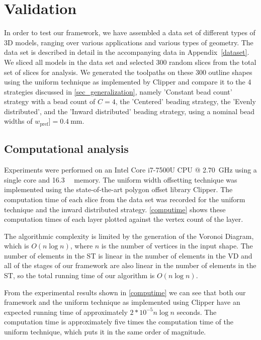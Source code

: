 \section{Validation}
In order to test our framework, we have assembled a data set of different types of 3D models, ranging over various applications and various types of geometry.
The data set is described in detail in the accompanying data in Appendix~\ref{dataset}.
We sliced all models in the data set and selected 300 random slices from the total set of slices for analysis.
We generated the toolpaths on these 300 outline shapes using the uniform technique as implemented by Clipper and compare it to the 4 strategies discussed in \cref{sec_generalization}, namely 'Constant bead count' strategy with a bead count of $C=4$, the 'Centered' beading strategy, the 'Evenly distributed', and the 'Inward distributed' beading strategy, using a nominal bead widths of $w_\text{pref}] = \SI{0.4}{\milli\meter}$.



\subsection{Computational analysis}
Experiments were performed on an Intel Core i7-7500U CPU @ \SI{2.70}{\giga\hertz} using a single core and \SI{16.3}{\giga\byte} memory.
The uniform width offsetting technique was implemented using the state-of-the-art polygon offset library Clipper. \cite{johnson2014clipper}
The computation time of each slice from the data set was recorded for the uniform technique and the inward distributed strategy. 
\cref{computime} shows these computation times of each layer plotted against the vertex count of the layer.

The algorithmic complexity is limited by the generation of the Voronoi Diagram, which is $O(n \log n)$, where $n$ is the number of vertices in the input shape.
The number of elements in the ST is linear in the number of elements in the VD
and all of the stages of our framework are also linear in the number of elements in the ST,
so the total running time of our algorithm is $O(n \log n)$.

From the experimental results shown in \cref{computime} we can see that both our framework and the uniform technique as implemented using Clipper have an expected running time of approximately $2*10^{-5} n \log n$ seconds.
The computation time is approximately five times the computation time of the uniform technique, which puts it in the same order of magnitude.

